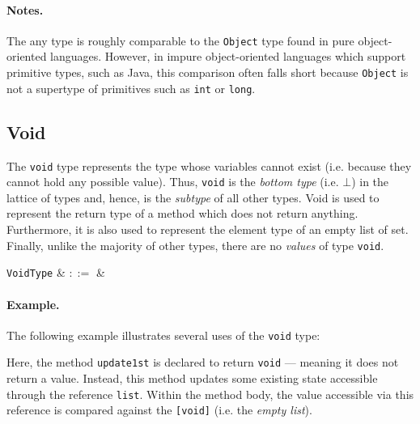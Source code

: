 \paragraph{Notes.}  The any type is roughly comparable to the \lstinline{Object} type found in pure object-oriented languages.  However, in impure object-oriented languages which support primitive types, such as Java, this comparison often falls short because \lstinline{Object} is not a supertype of primitives such as \lstinline{int} or \lstinline{long}.


\subsection{Void}
\label{c_types_void}

The \lstinline{void} type represents the type whose variables cannot exist (i.e. because they cannot hold any possible value).  Thus, \lstinline{void} is the {\em bottom type} (i.e. $\bot$) in the lattice of types and, hence, is the {\em subtype} of all other types.  Void is used to represent the return type of a method which does not return anything.  Furthermore, it is also used to represent the element type of an empty list of set.  Finally, unlike the majority of other types, there are no {\em values} of type \lstinline{void}.

\begin{syntax}
   \verb+VoidType+ & $::=$ &  \\
\end{syntax}

\paragraph{Example.} The following example illustrates several uses of the \lstinline{void} type:



Here, the method \lstinline{update1st} is declared to return \lstinline{void} --- meaning it does not return a value.  Instead, this method updates some existing state accessible through the reference \lstinline{list}.  Within the method body, the value accessible via this reference is compared against the \lstinline{[void]} (i.e. the {\em empty list}).



